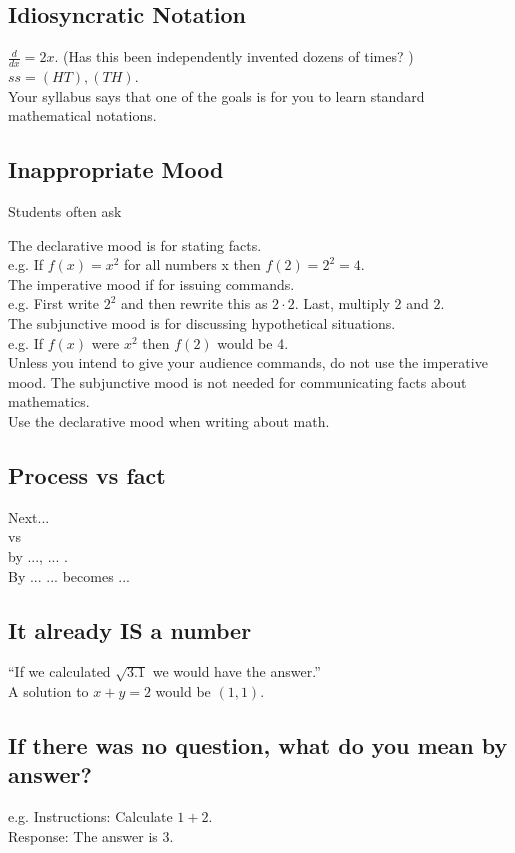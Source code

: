 \documentclass[12pt]{article}
\begin{document}
\subsection{Idiosyncratic Notation }
$\frac{d}{dx}= 2x.$ (Has this been independently invented dozens of times? )\\
$ss= (HT),(TH)$.\\
Your syllabus says that one of the goals is for you to learn standard mathematical notations. 

\subsection{Inappropriate Mood}
Students often ask 

The declarative mood is for stating facts.\\
e.g.  If $f(x)=x^2$ for all numbers x then $f(2)=2^2=4$. \\
The imperative mood if for issuing commands.\\
e.g.  First write $2^2$ and then rewrite this as $2\cdot 2$. Last, multiply $2$ and $2$.\\
The subjunctive mood is for discussing hypothetical situations.\\
e.g. If $f(x)$ were $x^2$ then $f(2)$ would be 4.\\[.2cm]

Unless you intend to give your audience commands, do not use the imperative mood. The subjunctive mood is not needed for communicating facts about mathematics. 
\\


Use the declarative mood when writing about math.


\subsection{Process vs fact}
Next...\\
vs\\
by ..., ... .\\
By ... ... becomes ...

\subsection{It already IS a number}
``If we calculated $\sqrt{3.1}$ we would have the answer.''\\
A solution to $x+y=2$ would be $(1,1)$.

\subsection{If there was no question, what do you mean by answer?}
e.g. Instructions: Calculate $1+2$.\\
Response: The answer is 3.
\end{document}
